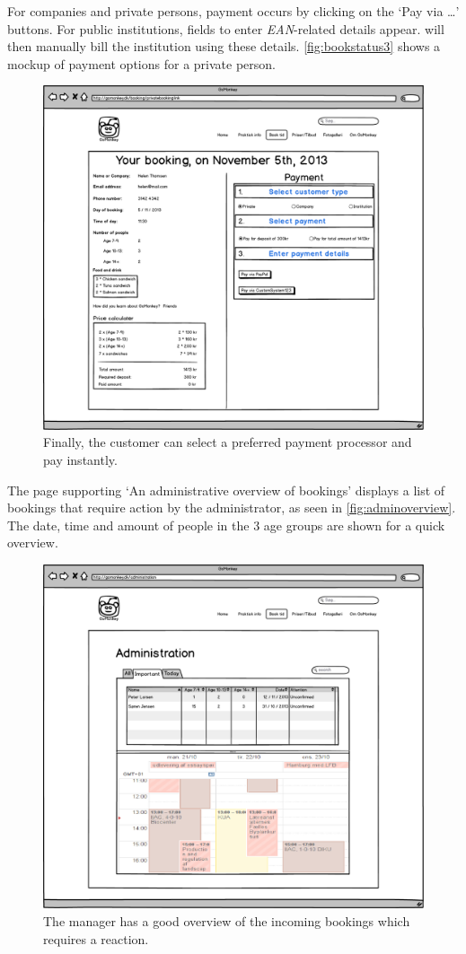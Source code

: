 For companies and private persons, payment occurs by clicking on the `Pay via
\ldots' buttons. For public institutions, fields to enter \textit{EAN}-related
details appear. \gomonkey{} will then manually bill the institution using these
details. \autoref{fig:bookstatus3} shows a mockup of payment options for a
private person.

\begin{figure}[htbp]
    \centering
        \includegraphics[width=.6\textwidth]{figures/mockup/booking_payment_3.png}
	    \caption{Finally, the customer can select a preferred payment processor and pay instantly.}
        \label{fig:bookstatus3}
\end{figure}

\FloatBarrier
\newpage


The page supporting `An administrative overview of bookings' displays a list of
bookings that require action by the administrator, as seen in
\autoref{fig:adminoverview}. The date, time and amount of people in the 3 age
groups are shown for a quick overview. 

\begin{figure}[htbp]
    \centering
        \includegraphics[width=.6\textwidth]{figures/mockup/overview_important.png}
	    \caption{The manager has a good overview of the incoming bookings which requires a reaction.}
        \label{fig:adminoverview}
\end{figure}

